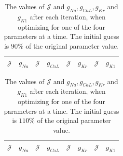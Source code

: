 \documentclass{article}
\begin{document}
\begin{table}
\begin{center}
  \begin{tabular}{c c | c c | c c | c c }
    $\mathcal{J}$ & $g_{Na}$ & $\mathcal{J}$ & $g_{CaL}$ & $\mathcal{J}$ & $g_{Kr}$ &  $\mathcal{J}$ & $g_{K1}$ \\ 
    \hline
  \end{tabular}
\end{center}
\caption{The values of $\mathcal{J}$ and $g_{Na}, g_{CaL}, g_{Kr}$ and $g_{K1}$ after each iteration, when optimizing for one of the four parameters at a time. The initial guess is $90\%$ of the original parameter value.}
\label{table:1}
\end{table}

\begin{table}
\begin{center}
  \begin{tabular}{c c | c c | c c | c c }
    $\mathcal{J}$ & $g_{Na}$ & $\mathcal{J}$ & $g_{CaL}$ & $\mathcal{J}$ & $g_{Kr}$ &  $\mathcal{J}$ & $g_{K1}$ \\ 
    \hline
  \end{tabular}
\end{center}
\caption{The values of $\mathcal{J}$ and $g_{Na}, g_{CaL}, g_{Kr}$ and $g_{K1}$ after each iteration, when optimizing for one of the four parameters at a time. The initial guess is $110\%$ of the original parameter value.}
\label{table:2}
\end{table}
\end{document}
